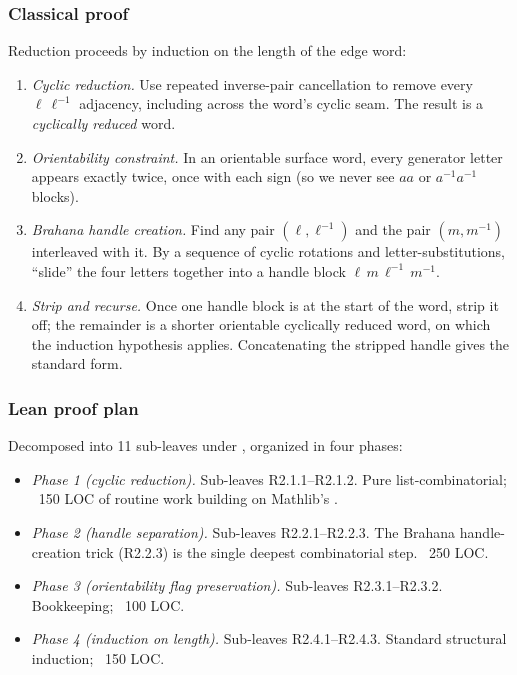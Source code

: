 \subsubsection*{Classical proof}

Reduction proceeds by induction on the length of the edge word:

\begin{enumerate}
\item \emph{Cyclic reduction.}  Use repeated inverse-pair cancellation
  to remove every \(\ell\,\ell^{-1}\) adjacency, including across the
  word's cyclic seam.  The result is a \emph{cyclically reduced}
  word.
\item \emph{Orientability constraint.}  In an orientable surface
  word, every generator letter appears exactly twice, once with each
  sign (so we never see \(a a\) or \(a^{-1} a^{-1}\) blocks).
\item \emph{Brahana handle creation.}  Find any pair
  \((\ell, \ell^{-1})\) and the pair \((m, m^{-1})\) interleaved
  with it.  By a sequence of cyclic rotations and
  letter-substitutions, ``slide'' the four letters together into a
  handle block \(\ell\,m\,\ell^{-1}\,m^{-1}\).
\item \emph{Strip and recurse.}  Once one handle block is at the
  start of the word, strip it off; the remainder is a shorter
  orientable cyclically reduced word, on which the induction
  hypothesis applies.  Concatenating the stripped handle gives the
  standard form.
\end{enumerate}

\subsubsection*{Lean proof plan}

Decomposed into 11 sub-leaves under
, organized in four phases:

\begin{itemize}
\item \emph{Phase 1 (cyclic reduction).}  Sub-leaves R2.1.1--R2.1.2.
  Pure list-combinatorial; ~150 LOC of routine  work
  building on Mathlib's .
\item \emph{Phase 2 (handle separation).}  Sub-leaves R2.2.1--R2.2.3.
  The Brahana handle-creation trick (R2.2.3) is the single deepest
  combinatorial step.  ~250 LOC.
\item \emph{Phase 3 (orientability flag preservation).}  Sub-leaves
  R2.3.1--R2.3.2.  Bookkeeping; ~100 LOC.
\item \emph{Phase 4 (induction on length).}  Sub-leaves
  R2.4.1--R2.4.3.  Standard structural induction; ~150 LOC.
\end{itemize}

